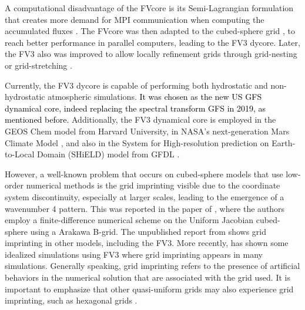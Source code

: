 A computational disadvantage of the FVcore is its Semi-Lagrangian formulation that creates more demand
for MPI communication when computing the accumulated fluxes \citep{lin:1996}.
The FVcore was then adapted to the cubed-sphere grid \citep{putmanthesis:2007, putman:2007}, 
to reach better performance in parallel computers, leading to the FV3 dycore.
Later, the FV3 also was improved to allow locally refinement grids 
through grid-nesting or grid-stretching \citep{harris:2013}.

Currently, the FV3 dycore is capable of performing both hydrostatic and non-hydrostatic atmospheric simulations. 
\textcolor{black}{It was chosen as the new US GFS dynamical core, indeed replacing the spectral transform GFS in 2019, as mentioned before.}
Additionally, the FV3 dynamical core is employed in the GEOS Chem model \citep{martin:2022} from Harvard University, 
in NASA’s next-generation Mars Climate Model \citep{wilson:2022}, 
and also in the System for High-resolution prediction on Earth-to-Local Domain (SHiELD) model from GFDL \citep{harris:2020}.

However, a well-known problem that occurs on cubed-sphere models that use low-order numerical methods
is the grid imprinting visible due to the coordinate system discontinuity, 
especially at larger scales, leading to the emergence of a wavenumber 4 pattern.
This was reported in the paper of \citet{rancic:2017}, where the authors employ a 
finite-difference numerical scheme on the Uniform Jacobian cubed-sphere using a Arakawa B-grid.
The unpublished report from \citet{whitaker:2015} shows grid imprinting in other models, including 
the FV3.
More recently, \citet{mouallem:2023} has shown some idealized simulations using FV3 where grid imprinting appears in many simulations.
Generally speaking, grid imprinting refers to the presence of artificial behaviors in the numerical solution that are associated with the grid used.
It is important to emphasize that other quasi-uniform grids may also experience grid imprinting, such as hexagonal grids \citep{weller:2012, peixoto:2013, peixoto:2016}.

